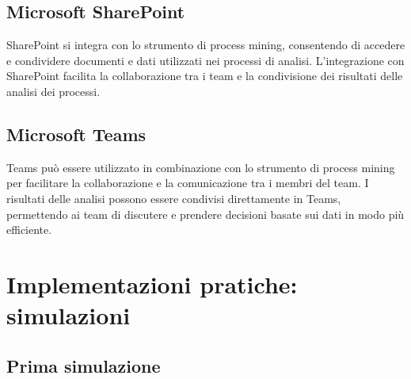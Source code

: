 \documentclass{article}
\begin{document}
\subsection{Microsoft SharePoint}
SharePoint si integra con lo strumento di process mining, consentendo di accedere e condividere documenti e dati utilizzati nei processi di analisi. L'integrazione con SharePoint facilita la collaborazione tra i team e la condivisione dei risultati delle analisi dei processi.

\subsection{Microsoft Teams}
Teams può essere utilizzato in combinazione con lo strumento di process mining per facilitare la collaborazione e la comunicazione tra i membri del team. I risultati delle analisi possono essere condivisi direttamente in Teams, permettendo ai team di discutere e prendere decisioni basate sui dati in modo più efficiente.


\section{Implementazioni pratiche: simulazioni}
\subsection{Prima simulazione}
\end{document}
